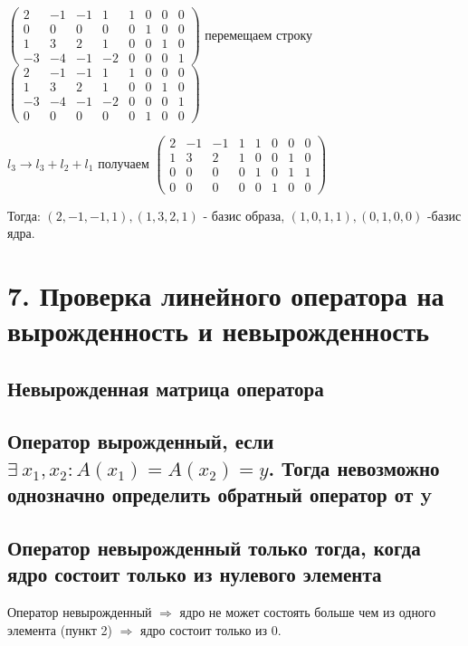 \documentclass[12pt]{article}
\begin{document}
$\left(\begin{array}{cccc|cccc}
            2  & -1 & -1 & 1  & 1 & 0 & 0 & 0 \\
            0  & 0  & 0  & 0  & 0 & 1 & 0 & 0 \\
            1  & 3  & 2  & 1  & 0 & 0 & 1 & 0 \\
            -3 & -4 & -1 & -2 & 0 & 0 & 0 & 1
        \end{array} \right)$ перемещаем строку $\left(\begin{array}{cccc|cccc}
            2  & -1 & -1 & 1  & 1 & 0 & 0 & 0 \\
            1  & 3  & 2  & 1  & 0 & 0 & 1 & 0 \\
            -3 & -4 & -1 & -2 & 0 & 0 & 0 & 1 \\
            0  & 0  & 0  & 0  & 0 & 1 & 0 & 0
        \end{array} \right)$

$l_3 \rightarrow l_3 + l_2 + l_1$ получаем $\left(\begin{array}{cccc|cccc}
            2 & -1 & -1 & 1 & 1 & 0 & 0 & 0 \\
            1 & 3  & 2  & 1 & 0 & 0 & 1 & 0 \\
            0 & 0  & 0  & 0 & 1 & 0 & 1 & 1 \\
            0 & 0  & 0  & 0 & 0 & 1 & 0 & 0
        \end{array} \right)$

Тогда: $(2,-1,-1,1), (1,3,2,1)$ - базис образа, $(1,0,1,1),(0,1,0,0)$ -базис ядра.

\section{7. Проверка линейного оператора на вырожденность и невырожденность}
\subsection{Невырожденная матрица оператора}
\subsection{Оператор вырожденный, если $\exists\ x_1, x_2 : A(x_1) = A(x_2) = y$. Тогда невозможно однозначно определить обратный оператор от y}
\subsection{Оператор невырожденный только тогда, когда ядро состоит только из нулевого элемента}
Оператор невырожденный $\Rightarrow$ ядро не может состоять больше чем из одного элемента (пункт 2) $\Rightarrow$ ядро состоит только из 0.
\end{document}
